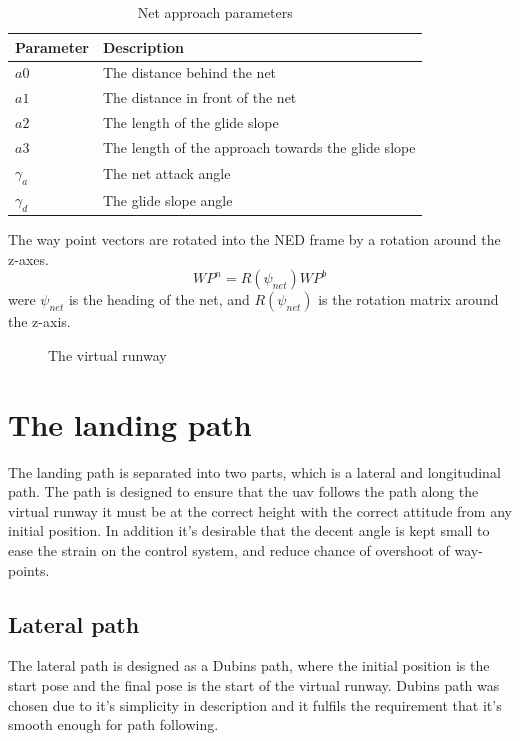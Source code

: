 \begin{table}[H]
\begin{center}
    \begin{tabular}{ | l | l |}
    \hline
    \textbf{Parameter} & \textbf{Description} \\ \hline
    $a0$ & The distance behind the net \\ \hline
    $a1$ & The distance in front of the net \\ \hline
    $a2$ & The length of the glide slope \\ \hline
    $a3$ & The length of the approach towards the glide slope \\ \hline
    $\gamma_a$ & The net attack angle \\ \hline
    $\gamma_d$ & The glide slope angle \\ \hline
    \end{tabular}
\end{center}
\caption{Net approach parameters }
\label{Tb:Approach Parameters}
\end{table}
The way point vectors are rotated into the NED frame by a rotation around the z-axes.
\begin{equation}
WP^n = R(\psi_{net})WP^b
\end{equation}
were $\psi_{net}$ is the heading of the net, and $R(\psi_{net})$ is the rotation matrix around the z-axis.
\begin{figure}\label{Fig:LandingPhase}
\def\svgwidth{\textwidth} %

\caption{The virtual runway}
\end{figure}

\section{The landing path}\label{SS:LandingApproach}
The landing path is separated into two parts, which is a lateral and longitudinal path. The path is designed to ensure that the \gls{uav} follows the path along the virtual runway it must be at the correct height with the correct attitude from any initial position. In addition it's desirable that the decent angle is kept small to ease the strain on the control system, and reduce chance of overshoot of way-points.
\subsection{Lateral path}
The lateral path is designed as a Dubins path, where the initial position is the start pose and the final pose is the start of the virtual runway. Dubins path was chosen due to it's simplicity in description and it fulfils the requirement that it's smooth enough for path following.

